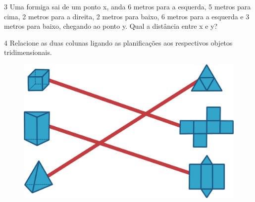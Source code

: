 \begin{emptybox}
\end{emptybox}

\pagebreak
\num{3} Uma formiga sai de um ponto x, anda 6 metros para a esquerda, 5
metros para cima, 2 metros para a direita, 2 metros para baixo, 6 metros
para a esquerda e 3 metros para baixo, chegando ao ponto y. Qual a
distância entre x e y?

\begin{emptybox}
\end{emptybox}

\pagebreak
\num{4} Relacione as duas colunas ligando as planificações aos respectivos
objetos tridimensionais.

\begin{figure}[htpb!]
\centering
\includegraphics[width=\textwidth]{./ilustras-mat/modulo_10-atividade_4_resposta.png}
\end{figure}

